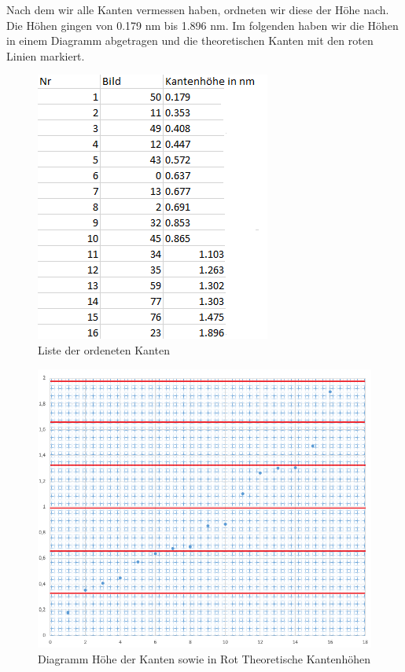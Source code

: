 \documentclass[10pt,a4paper]{article}
\begin{document}
Nach dem wir alle Kanten vermessen haben, ordneten wir diese der Höhe nach. Die Höhen gingen von 0.179 nm bis 1.896 nm. Im folgenden haben wir die Höhen in einem Diagramm abgetragen und die theoretischen Kanten mit den roten Linien markiert.

\begin{figure}[]
	\includegraphics[scale = 0.5]{khglist.png}
	\centering
	\caption{Liste der ordeneten Kanten}
	\label{list}
\end{figure}

\begin{figure}[]
	\includegraphics[scale = 0.5]{khgdia.png}
	\centering
	\caption{Diagramm Höhe der Kanten sowie in Rot Theoretische Kantenhöhen}
	\label{list}
\end{figure}
\end{document}
